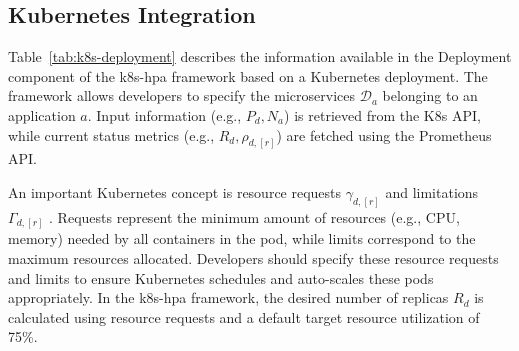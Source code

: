 \documentclass[conference]{IEEEtran}
\begin{document}
\subsection{Kubernetes Integration}

Table~\ref{tab:k8s-deployment} describes the information available in the Deployment component of the k8s-hpa framework based on a Kubernetes deployment. The framework allows developers to specify the microservices $\mathcal{D}_a$ belonging to an application $a$. Input information (e.g., $P_d, N_a$) is retrieved from the K8s API, while current status metrics (e.g., $R_d, \rho_{d,[r]}$) are fetched using the Prometheus API.

An important Kubernetes concept is resource requests $\gamma_{d,[r]}$ and limitations $\Gamma_{d,[r]}$ \cite{kubernetes_resource_management}. Requests represent the minimum amount of resources (e.g., CPU, memory) needed by all containers in the pod, while limits correspond to the maximum resources allocated. Developers should specify these resource requests and limits to ensure Kubernetes schedules and auto-scales these pods appropriately. In the k8s-hpa framework, the desired number of replicas $R_d$ is calculated using resource requests and a default target resource utilization of 75\%.
\end{document}
